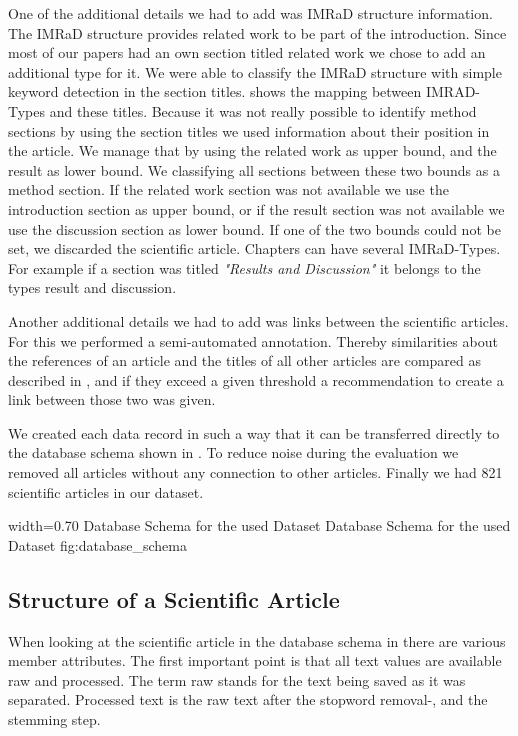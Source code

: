 One of the additional details we had to add was IMRaD structure information. The IMRaD structure provides related work to be part of the introduction. Since most of our papers had an own section titled related work we chose to add an additional type for it. We were able to classify the IMRaD structure with simple keyword detection in the section titles.  shows the mapping between IMRAD-Types and these titles. Because it was not really possible to identify method sections by using the section titles we used information about their position in the article. We manage that by using the related work as upper bound, and the result as lower bound. We classifying all sections between these two bounds as a method section. If the related work section was not available we use the introduction section as upper bound, or if the result section was not available we use the discussion section as lower bound. If one of the two bounds could not be set, we discarded the scientific article. Chapters can have several IMRaD-Types. For example if a section was titled \textit{"Results and Discussion"} it belongs to the types result and discussion.

Another additional details we had to add was links between the scientific articles. For this we performed a semi-automated annotation. Thereby similarities about the references of an article and the titles of all other articles are compared as described in , and if they exceed a given threshold a recommendation to create a link between those two was given.

We created each data record in such a way that it can be transferred directly to the database schema shown in . To reduce noise during the evaluation we removed all articles without any connection to other articles. Finally we had 821 scientific articles in our dataset.

      {width=0.70\textwidth}
      {Database Schema for the used Dataset}
      {Database Schema for the used Dataset}
      {fig:database_schema}

\subsection{Structure of a Scientific Article}
\label{sec:structure_scientific_article}

When looking at the scientific article in the database schema in  there are various member attributes. The first important point is that all text values are available raw and processed. The term raw stands for the text being saved as it was separated. Processed text is the raw text after the stopword removal-, and the stemming step.

